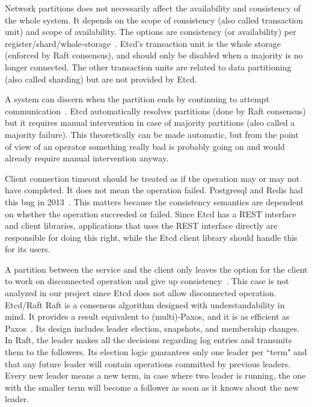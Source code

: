 \documentclass[12pt,conference]{IEEEtran}
\begin{document}
Network partitions does not necessarily affect the availability and consistency of the whole system. It depends on the scope of consistency (also called transaction unit) and scope of availability. The options are consistency (or availability) per register/shard/whole-storage~\cite{brewer2012cap}. Etcd’s transaction unit is the whole storage (enforced by Raft consensus), and should only be disabled when a majority is no longer connected. The other transaction units are related to data partitioning (also called sharding) but are not provided by Etcd.

A system can discern when the partition ends by continuing to attempt communication~\cite{brewer2012cap}. Etcd automatically resolves partitions (done by Raft consensus) but it requires manual intervention in case of majority partitions (also called a majority failure). This theoretically can be made automatic, but from the point of view of an operator something really bad is probably going on and would already require manual intervention anyway.

Client connection timeout should be treated as if the operation may or may not have completed. It does not mean the operation failed. Postgresql and Redis had this bug in 2013~\cite{postgresJepsenPostWebsite}. This matters because the consistency semantics are dependent on whether the operation succeeded or failed. Since Etcd has a REST interface and client libraries, applications that uses the REST interface directly are responsible for doing this right, while the Etcd client library should handle this for its users.

A partition between the service and the client only leaves the option for the client to work on disconnected operation and give up consistency~\cite{brewer2012cap}. This case is not analyzed in our project since Etcd does not allow disconnected operation.
Etcd/Raft
Raft is a consensus algorithm designed with understandability in mind. It provides a result equivalent to (multi)-Paxos, and it is as efficient as Paxos~\cite{ongaro2014search}. Its design includes leader election, snapshots, and membership changes. In Raft, the leader makes all the decisions regarding log entries and transmits them to the followers. Its election logic guarantees only one leader per “term" and that any future leader will contain operations committed by previous leaders. Every new leader means a new term, in case where two leader is running, the one with the smaller term will become a follower as soon as it knows about the new leader.
\end{document}
